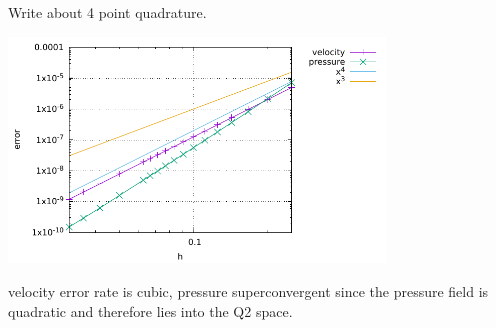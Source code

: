 {\color{red} Write about 4 point quadrature}.









\begin{center}
\includegraphics[width=10cm]{python_codes/fieldstone_saddlepoint_q3q2/errors}
\end{center}

velocity error rate is cubic, pressure superconvergent since the pressure field
is quadratic and therefore lies into the Q2 space.
